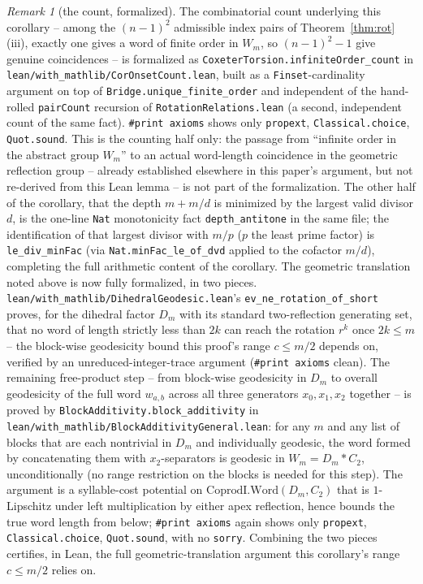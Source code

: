 \documentclass[11pt]{article}
\theoremstyle{definition}
\theoremstyle{remark}
\newtheorem{remark}[theorem]{Remark}
\begin{document}
\begin{remark}[the count, formalized]\label{rem:onset-lean}
The combinatorial count underlying this corollary -- among the $(n-1)^2$ admissible index
pairs of Theorem~\textup{\ref{thm:rot}}(iii), exactly one gives a word of finite order in
$W_m$, so $(n-1)^2-1$ give genuine coincidences -- is formalized as
\texttt{CoxeterTorsion.infiniteOrder\_count} in
\texttt{lean/with\_mathlib/CorOnsetCount.lean}, built as a \texttt{Finset}-cardinality
argument on top of \texttt{Bridge.unique\_finite\_order} and independent of the
hand-rolled \texttt{pairCount} recursion of \texttt{RotationRelations.lean} (a second,
independent count of the same fact). \texttt{\#print axioms} shows only
\texttt{propext}, \texttt{Classical.choice}, \texttt{Quot.sound}. This is the counting
half only: the passage from ``infinite order in the abstract group $W_m$'' to an actual
word-length coincidence in the geometric reflection group -- already established
elsewhere in this paper's argument, but not re-derived from this Lean lemma -- is not
part of the formalization. The other half of the corollary, that the depth $m+m/d$ is
minimized by the largest valid divisor $d$, is the one-line \texttt{Nat} monotonicity
fact \texttt{depth\_antitone} in the same file; the identification of that largest
divisor with $m/p$ ($p$ the least prime factor) is \texttt{le\_div\_minFac} (via
\texttt{Nat.minFac\_le\_of\_dvd} applied to the cofactor $m/d$), completing the full
arithmetic content of the corollary. The geometric translation noted above is now
fully formalized, in two pieces. \texttt{lean/with\_mathlib/DihedralGeodesic.lean}'s
\texttt{ev\_ne\_rotation\_of\_short} proves, for the dihedral factor $D_m$ with its
standard two-reflection generating set, that no word of length strictly less than
$2k$ can reach the rotation $r^k$ once $2k\le m$ -- the block-wise geodesicity bound
this proof's range $c\le m/2$ depends on, verified by an unreduced-integer-trace
argument (\texttt{\#print axioms} clean). The remaining free-product step -- from
block-wise geodesicity in $D_m$ to overall geodesicity of the full word $w_{a,b}$
across all three generators $x_0,x_1,x_2$ together -- is proved by
\texttt{BlockAdditivity.block\_additivity} in
\texttt{lean/with\_mathlib/BlockAdditivityGeneral.lean}: for any $m$ and any list of
blocks that are each nontrivial in $D_m$ and individually geodesic, the word formed
by concatenating them with $x_2$-separators is geodesic in $W_m=D_m * C_2$,
unconditionally (no range restriction on the blocks is needed for this step). The
argument is a syllable-cost potential on $\mathrm{CoprodI.Word}(D_m,C_2)$ that is
$1$-Lipschitz under left multiplication by either apex reflection, hence bounds the
true word length from below; \texttt{\#print axioms} again shows only
\texttt{propext}, \texttt{Classical.choice}, \texttt{Quot.sound}, with no
\texttt{sorry}. Combining the two pieces certifies, in Lean, the full
geometric-translation argument this corollary's range $c\le m/2$ relies on.
\end{remark}
\end{document}
